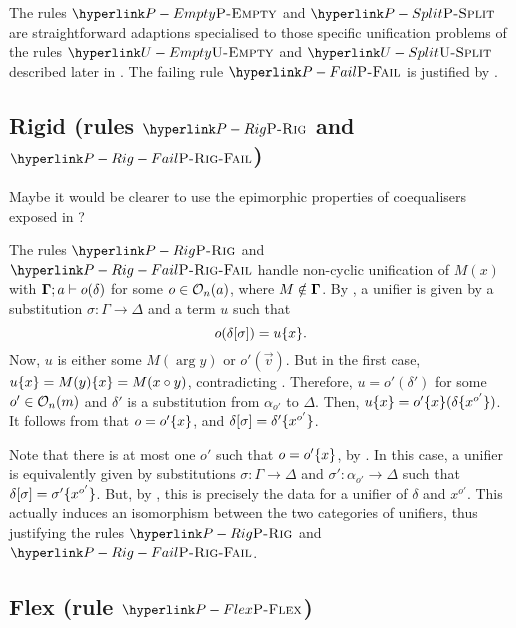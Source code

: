 The rules $\refrule{P-Empty}$ and $\refrule{P-Split}$ are straightforward
adaptions specialised to those specific unification problems of the
rules $\refrule{U-Empty}$ and $\refrule{U-Split}$ described later
in . The failing rule $\refrule{P-Fail}$
is justified by .

\subsection[Rigid (rules P-Rig and P-Rig-Fail)]{Rigid (rules $\protect\refrule{P-Rig}$ and $\protect\refrule{P-Rig-Fail}$)}

\label{subsec:case-KA-RiTC}
\begin{personalquestion}
Maybe it would be clearer to use the epimorphic properties of coequalisers
exposed in \citet[Chapter 9]{DBLP:books/daglib/0068768}?
\end{personalquestion}
The rules $\refrule{P-Rig}$ and $\refrule{P-Rig-Fail}$ handle non-cyclic
unification of $M(x)$ with $\dotmcontext{\Gamma};a\vdash o(\delta)$
for some $o\in\Oop na$, where $M\notin\dotmcontext{\Gamma}$. By
, a unifier is given by a substitution $\sigma:\Gamma\rightarrow\Delta$
and a term $u$ such that 
\begin{equation}
o(\delta[\sigma])=\rename ux.\label{eq:unif-prig}
\end{equation}
Now, $u$ is either some $M(\arg y)$ or $o'(\vec{v})$. But in the
first case, $\rename ux=\rename{M(y)}x=M(\arg x\circ\arg y)$, contradicting
. Therefore, $u=o'(\delta')$ for some $o'\in\Oop nm$
and $\delta'$ is a substitution from $\alpha_{o'}$ to $\Delta$.
Then, $\rename ux=\rename{o'}x(\rename{\delta}{\ntharvecaction{o'}x{}})$.
It follows from  that $o=\rename{o'}x$, and $\delta[\sigma]=\rename{\delta'}{\ntharvecaction{o'}x{}}$.

Note that there is at most one $o'$ such that $o=\rename{o'}x$,
by . In this case, a unifier is equivalently given
by substitutions $\sigma:\Gamma\rightarrow\Delta$ and $\sigma':\alpha_{o'}\rightarrow\Delta$
such that $\delta[\sigma]=\rename{\sigma'}{\ntharvecaction{o'}x{}}$.
But, by , this is precisely the data for a
unifier of $\delta$ and $x^{o'}$. This actually induces an isomorphism
between the two categories of unifiers, thus justifying the rules
$\refrule{P-Rig}$ and $\refrule{P-Rig-Fail}$. 

\subsection[Flex (rule P-Flex)]{Flex (rule $\protect\refrule{P-Flex}$)}

